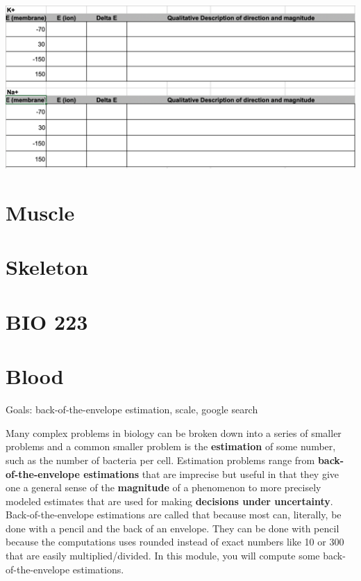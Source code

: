 \documentclass[]{book}
\begin{document}
\includegraphics{images/nernst-output_table_2.png}

\chapter{Muscle}\label{muscle}

\chapter{Skeleton}\label{skeleton}

\chapter*{BIO 223}\label{bio-223}

\chapter{Blood}\label{blood}

Goals: back-of-the-envelope estimation, scale, google search

Many complex problems in biology can be broken down into a series of
smaller problems and a common smaller problem is the \textbf{estimation}
of some number, such as the number of bacteria per cell. Estimation
problems range from \textbf{back-of-the-envelope estimations} that are
imprecise but useful in that they give one a general sense of the
\textbf{magnitude} of a phenomenon to more precisely modeled estimates
that are used for making \textbf{decisions under uncertainty}.
Back-of-the-envelope estimations are called that because most can,
literally, be done with a pencil and the back of an envelope. They can
be done with pencil because the computations uses rounded instead of
exact numbers like 10 or 300 that are easily multiplied/divided. In this
module, you will compute some back-of-the-envelope estimations.
\end{document}
